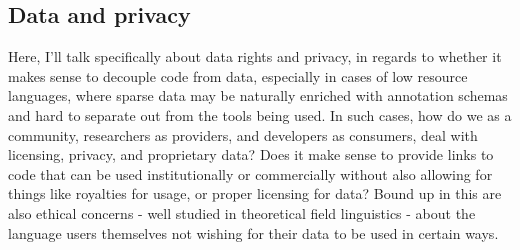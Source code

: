 %
%

\subsection{Data and privacy}
\label{subsec:data-and-privacy}

Here, I'll talk specifically about data rights and privacy, in regards to whether it makes sense to decouple code from data, especially in cases of low resource languages, where sparse data may be naturally enriched with annotation schemas and hard to separate out from the tools being used. In such cases, how do we as a community, researchers as providers, and developers as consumers, deal with licensing, privacy, and proprietary data? Does it make sense to provide links to code that can be used institutionally or commercially without also allowing for things like royalties for usage, or proper licensing for data? Bound up in this are also ethical concerns - well studied in theoretical field linguistics - about the language users themselves not wishing for their data to be used in certain ways.





